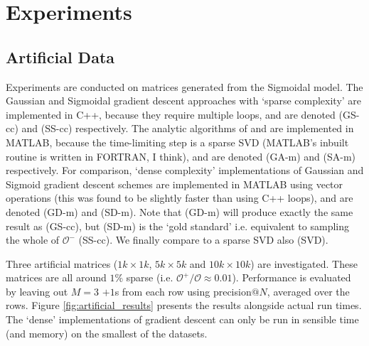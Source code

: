 \documentclass{article}
\begin{document}
\section{Experiments\label{sec:experiments}}

\subsection{Artificial Data}

Experiments are conducted on matrices generated from the Sigmoidal model.
The Gaussian and Sigmoidal gradient descent approaches with `sparse complexity'
are implemented in C++, because they require multiple loops, and are denoted (GS-cc) and (SS-cc)
respectively. The analytic algorithms of \citep{nakajima2010} and \citep{seeger2012}
are implemented in MATLAB, because the time-limiting step is a sparse SVD (MATLAB's inbuilt routine
is written in FORTRAN, I think), and are denoted (GA-m) and (SA-m) respectively.
For comparison, `dense complexity' implementations of Gaussian and Sigmoid gradient descent 
schemes are implemented in MATLAB using vector operations (this was found to be slightly faster
than using C++ loops), and are denoted (GD-m) and (SD-m). Note that (GD-m) will produce 
exactly the same result as (GS-cc), but (SD-m) is the `gold standard' i.e. equivalent to sampling the whole of $\mathcal{O}^-$ (SS-cc). We finally compare to a sparse SVD also (SVD).

Three artificial matrices ($1k\times 1k$, $5k\times 5k$ and $10k \times 10k$) are investigated.
These matrices are all around $1\%$ sparse (i.e. $\mathcal{O}^+/\mathcal{O}\approx 0.01$). Performance is evaluated by leaving out $M=3$ $+1$s from each row using precision$@N$, averaged over the rows. Figure \ref{fig:artificial_results} presents the results alongside actual run times.
The `dense' implementations of gradient descent can only be run in sensible time (and memory) on the smallest of the datasets.
\end{document}
